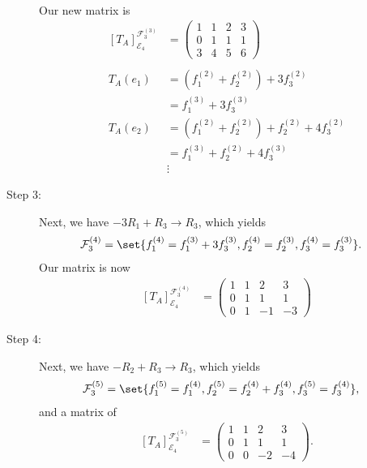 \documentclass[10pt]{mypackage}
\begin{document}
\begin{example}
\begin{description}
\begin{align*}
      \end{align*}
      Our new matrix is
      \begin{align*}
        \left[T_{A}\right]_{\mathcal{E}_4}^{\mathcal{F}_3^{(3)}} &= \begin{pmatrix}1 & 1 & 2 & 3 \\ 0 & 1 & 1 & 1 \\ 3 & 4 & 5 & 6\end{pmatrix}\\
        \\
        T_A\left(e_1\right) &= \left(f_1^{(2)} + f_{2}^{(2)}\right) + 3f_{3}^{(2)}\\
                            &= f_{1}^{(3)} + 3f_3^{(3)}\\
        T_{A}\left(e_2\right) &= \left(f_1^{(2)} + f_2^{(2)}\right) + f_{2}^{(2)} + 4f_3^{(2)}\\
                              &= f_1^{(3)} + f_2^{(2)} + 4f_3^{(3)}\\
                              &\vdots
      \end{align*}
    \item[Step 3:] Next, we have $-3R_1 + R_3\rightarrow R_3$, which yields
      \begin{align*}
        \mathcal{F}_3^{(4)} &= \set{f_1^{(4)} = f_{1}^{(3)} + 3f_{3}^{(3)},f_{2}^{(4)} = f_{2}^{(3)},f_{3}^{(4)} = f_{3}^{(3)}}.
      \end{align*}
      Our matrix is now
      \begin{align*}
        \left[T_{A}\right]_{\mathcal{E}_{4}}^{\mathcal{F}_{3}^{(4)}} &= \begin{pmatrix}1 & 1 & 2 & 3 \\ 0 & 1 & 1 & 1 \\ 0 & 1 & -1 & -3\end{pmatrix}
      \end{align*}
    \item[Step 4:] Next, we have $-R_2 + R_3 \rightarrow R_3$, which yields
      \begin{align*}
        \mathcal{F}_{3}^{(5)} &= \set{f_{1}^{(5)} = f_{1}^{(4)},f_{2}^{(5)} = f_{2}^{(4)} + f_{3}^{(4)},f_{3}^{(5)} = f_{3}^{(4)}},
      \end{align*}
      and a matrix of
      \begin{align*}
        \left[T_{A}\right]_{\mathcal{E}_4}^{\mathcal{F}_3^{(5)}} &= \begin{pmatrix}1 & 1 & 2 & 3 \\ 0 & 1 & 1 & 1 \\ 0 & 0 & -2 & -4\end{pmatrix}.
      \end{align*}
  \end{description}
\end{example}
\end{document}
